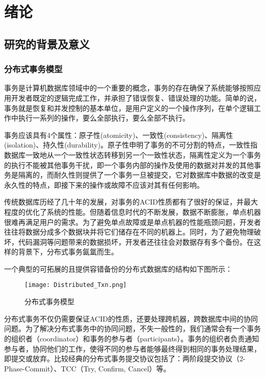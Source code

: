 
\chapter{绪论}

\section{研究的背景及意义}

\subsection{分布式事务模型}
  事务是计算机数据库领域中的一个重要的概念，事务的存在确保了系统能够按照应用开发者既定的逻辑完成工作，并承担了错误恢复、错误处理的功能。简单的说，事务就是恢复和并发控制的基本单位，是用户定义的一个操作序列，在单个逻辑工作中执行一系列的操作，要么全部执行，要么全部不执行。

  事务应该具有4个属性：原子性(atomicity)、一致性(consistency)、隔离性(isolation)、持久性(durability)。原子性申明了事务的不可分割的特点，一致性指数据库一致地从一个一致性状态转移到另一个一致性状态，隔离性定义为一个事务的执行不能被其他事务干扰，即一个事务内部的操作及使用的数据对并发的其他事务是隔离的，而耐久性则提供了一个事务一旦被提交，它对数据库中数据的改变是永久性的特点，即接下来的操作或故障不应该对其有任何影响。

  传统数据库历经了几十年的发展，对事务的ACID性质都有了很好的保证，并最大程度的优化了系统的性能。但随着信息时代的不断发展，数据不断膨胀，单点机器很难再满足用户的需求。为了避免单点故障或是单点机器的性能瓶颈问题，开发者往往将数据分成多个数据块并将它们储存在不同的机器上。同时，为了避免物理破坏，代码漏洞等问题带来的数据损坏，开发者还往往会对数据存有多个备份。在这样的背景下，分布式事务氤氲而生。
  
  一个典型的可拓展的且提供容错备份的分布式数据库的结构如下图所示：

\begin{figure}[htb]
  \centering
  \texttt{[image: Distributed\_Txn.png]}
  \caption{分布式事务模型}
  \label{fig:badge}
\end{figure}


  分布式事务不仅仍需要保证ACID的性质，还要处理跨机器，跨数据库中间的协同问题。\cite{MultiDBTXN1,MultiDBTXN2,MultiDBTXN3}为了解决分布式事务中的协同问题，不失一般性的，我们通常会有一个事务的组织者（coordinator）和事务的参与者（participants）。事务的组织者负责通知参与者，协同他们的工作，使得不同的参与者能够最终得到相同的事务处理结果，即提交或放弃。比较经典的分布式事务提交协议包括了：两阶段提交协议（2-Phase-Commit）、TCC（Try, Confirm, Cancel）等。
  
